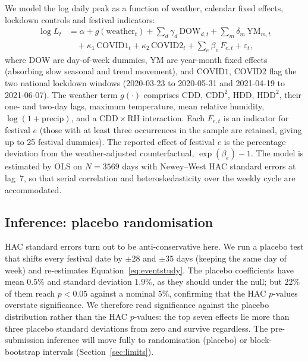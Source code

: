 \documentclass[11pt]{article}
\newcommand{\pct}{\%}
\begin{document}
We model the log daily peak as a function of weather, calendar fixed effects,
lockdown controls and festival indicators:
\begin{align}
\log L_t
  &= \alpha
   + g(\text{weather}_t)
   + \sum_{d} \gamma_d\,\mathrm{DOW}_{d,t}
   + \sum_{m} \delta_m\,\mathrm{YM}_{m,t} \nonumber\\
  &\quad + \kappa_1\,\mathrm{COVID1}_t
   + \kappa_2\,\mathrm{COVID2}_t
   + \sum_{e} \beta_e\,F_{e,t}
   + \varepsilon_t ,
\label{eq:eventstudy}
\end{align}
where $\mathrm{DOW}$ are day-of-week dummies, $\mathrm{YM}$ are year-month fixed
effects (absorbing slow seasonal and trend movement), and $\mathrm{COVID1}$,
$\mathrm{COVID2}$ flag the two national lockdown windows (2020-03-23 to
2020-05-31 and 2021-04-19 to 2021-06-07). The weather term $g(\cdot)$ comprises
$\mathrm{CDD}$, $\mathrm{CDD}^2$, $\mathrm{HDD}$, $\mathrm{HDD}^2$, their one- and
two-day lags, maximum temperature, mean relative humidity, $\log(1+\text{precip})$,
and a $\mathrm{CDD}\times\mathrm{RH}$ interaction. Each $F_{e,t}$ is an indicator
for festival $e$ (those with at least three occurrences in the sample are
retained, giving up to 25 festival dummies). The reported effect of festival $e$
is the percentage deviation from the weather-adjusted counterfactual,
$\exp(\beta_e)-1$. The model is estimated by OLS on $N=\num{3569}$ days with
Newey--West HAC standard errors at lag~7, so that serial correlation and
heteroskedasticity over the weekly cycle are accommodated.

\subsection{Inference: placebo randomisation}
\label{sec:placebo}

HAC standard errors turn out to be anti-conservative here. We run a placebo test
that shifts every festival date by $\pm 28$ and $\pm 35$ days (keeping the same
day of week) and re-estimates Equation~\eqref{eq:eventstudy}. The placebo
coefficients have mean $0.5\pct$ and standard deviation $1.9\pct$, as they should
under the null; but $22\pct$ of them reach $p<0.05$ against a nominal $5\pct$,
confirming that the HAC $p$-values overstate significance. We therefore read
significance against the placebo distribution rather than the HAC $p$-values: the
top seven effects lie more than three placebo standard deviations from zero and
survive regardless. The pre-submission inference will move fully to
randomisation (placebo) or block-bootstrap intervals
(Section~\ref{sec:limits}).
\end{document}
